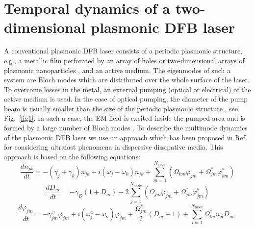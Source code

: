 \documentclass[aps,pra,amsmath,amssymb,onecolumn,superscriptaddress,showpacs,floatfix,]{revtex4-1}
\begin{document}
\section*{Temporal dynamics of a two-dimensional plasmonic DFB laser}
A conventional plasmonic DFB laser consists of a periodic plasmonic structure, e.g., a metallic film perforated by an array of holes \cite{BeijnumPRL,DorofeenkoOptExp,MengLPR,nefedkin2018acsphot,TennerJOpt,TennerACSPhot,Zyablovsky2017Optimum,Melentiev2017nanolaser} or two-dimensional arrays of plasmonic nanoparticles \cite{ZhouNatNano,SchokkerPRB,daskalakis2018nanolett,SchokkerACSPhot,YangNatComm,YangACSNano,hakala2017lasing,wang2017band}, and an active medium.
The eigenmodes of such a system are Bloch modes which are distributed over the whole surface of the laser.
To overcome losses in the metal, an external pumping (optical or electrical) of the active medium is used.
In the case of optical pumping, the diameter of the pump beam is usually smaller than the size of the periodic plasmonic structure \cite{TennerACSPhot,ZhouNatNano,daskalakis2018nanolett}, see Fig.~\ref{fig1}.
In such a case, the EM field is excited inside the pumped area and is formed by a large number of Bloch modes \cite{TennerACSPhot,nefedkin2018acsphot}.
To describe the multimode dynamics of the plasmonic DFB laser we use an approach which has been proposed in Ref. \cite{Zyablovsky2017approach} for considering ultrafast phenomena in dispersive dissipative media.
This approach is based on the following equations:
\begin{equation}\label{eq1}
\frac{{d{n_{jk}}}}{{dt}} =  - \left( {{\gamma _j} + {\gamma _k}} \right){n_{jk}} + i\left( {{\omega _j} - {\omega _k}} \right){n_{jk}} + \sum\limits_{m=1}^{N_{\text{atom}}} {\left( {{\Omega _{km}}{\varphi _{jm}} + \Omega _{jm}^*\varphi _{km}^*} \right)} 
\end{equation}
\begin{equation}\label{eq2}
\frac{{d{D_m}}}{{dt}} =  - {\gamma _D}\left( {1 + {D_m}} \right)  - 2\sum\limits_{j=1}^{N_{\text{mode}}} {\left( {{\Omega _{jm}}{\varphi _{jm}} + \Omega _{jm}^*\varphi _{jm}^*} \right)} 
\end{equation}
\begin{equation}\label{eq3}
\frac{{d{\varphi _{jm}}}}{{dt}} =  -\gamma_{jm}^{\varphi} {\varphi _{jm}} + i\left( {{\omega _j^a} - {\omega _\sigma }} \right){\varphi _{jm}} + \frac{{\Omega _{jm}^*}}{2}\left( {{D_m} + 1} \right) + \sum\limits_{l=1}^{N_{\text{mode}}} {\Omega _{lm}^*{n_{jl}}{D_m}} , 
\end{equation}
\end{document}
